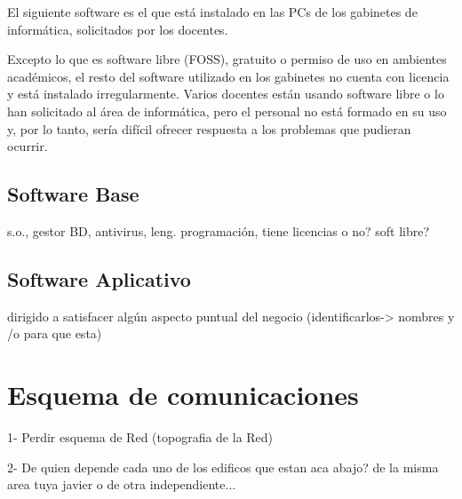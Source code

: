 \documentclass[10pt,a4paper,final]{article}
\begin{document}
\begin{scriptsize}

El siguiente software es el que está instalado en las PCs de los gabinetes de informática, solicitados por los docentes. 

Excepto lo que es software libre (FOSS), gratuito o permiso de uso en ambientes académicos, el resto del software utilizado en los gabinetes no cuenta con licencia y está instalado irregularmente. Varios docentes están usando software libre o lo han solicitado al área de informática, pero el personal no está formado en su uso y, por lo tanto, sería difícil ofrecer respuesta a los problemas que pudieran ocurrir.
\end{scriptsize}

\subsection{Software Base}
s.o., gestor BD, antivirus, leng. programación, tiene licencias o no? soft libre?

\subsection{Software Aplicativo}
dirigido a satisfacer algún aspecto puntual del negocio (identificarlos-> nombres y /o para que esta)

\section{Esquema de comunicaciones}
1- Perdir esquema de Red (topografia de la Red)

2- De quien depende cada uno de los edificos que estan aca abajo? de la misma area tuya javier o de otra independiente...
\end{document}
